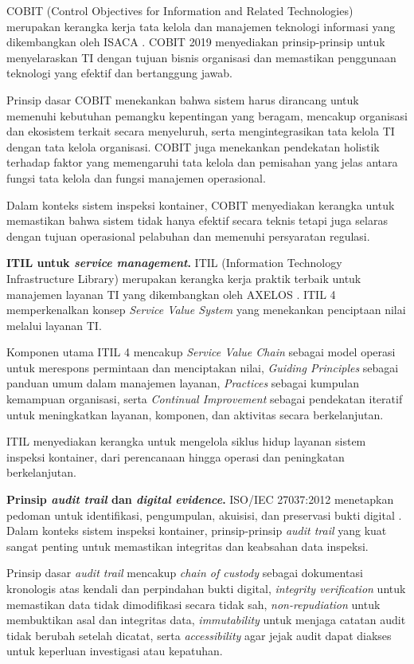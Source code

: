 COBIT (Control Objectives for Information and Related Technologies) merupakan kerangka kerja tata kelola dan manajemen teknologi informasi yang dikembangkan oleh ISACA \autocite{isaca2019}. COBIT 2019 menyediakan prinsip-prinsip untuk menyelaraskan TI dengan tujuan bisnis organisasi dan memastikan penggunaan teknologi yang efektif dan bertanggung jawab.

Prinsip dasar COBIT menekankan bahwa sistem harus dirancang untuk memenuhi
kebutuhan pemangku kepentingan yang beragam, mencakup organisasi dan ekosistem
terkait secara menyeluruh, serta mengintegrasikan tata kelola TI dengan tata
kelola organisasi. COBIT juga menekankan pendekatan holistik terhadap faktor
yang memengaruhi tata kelola dan pemisahan yang jelas antara fungsi tata kelola
dan fungsi manajemen operasional.

Dalam konteks sistem inspeksi kontainer, COBIT menyediakan kerangka untuk memastikan bahwa sistem tidak hanya efektif secara teknis tetapi juga selaras dengan tujuan operasional pelabuhan dan memenuhi persyaratan regulasi.

\textbf{ITIL untuk \textit{service management}.}
ITIL (Information Technology Infrastructure Library) merupakan kerangka kerja praktik terbaik untuk manajemen layanan TI yang dikembangkan oleh AXELOS \autocite{axelos2019}. ITIL 4 memperkenalkan konsep \textit{Service Value System} yang menekankan penciptaan nilai melalui layanan TI.

Komponen utama ITIL 4 mencakup \textit{Service Value Chain} sebagai model
operasi untuk merespons permintaan dan menciptakan nilai, \textit{Guiding
Principles} sebagai panduan umum dalam manajemen layanan, \textit{Practices}
sebagai kumpulan kemampuan organisasi, serta \textit{Continual Improvement}
sebagai pendekatan iteratif untuk meningkatkan layanan, komponen, dan aktivitas
secara berkelanjutan.

ITIL menyediakan kerangka untuk mengelola siklus hidup layanan sistem inspeksi kontainer, dari perencanaan hingga operasi dan peningkatan berkelanjutan.

\textbf{Prinsip \textit{audit trail} dan \textit{digital evidence}.}
ISO/IEC 27037:2012 menetapkan pedoman untuk identifikasi, pengumpulan, akuisisi, dan preservasi bukti digital \autocite{iso27037}. Dalam konteks sistem inspeksi kontainer, prinsip-prinsip \textit{audit trail} yang kuat sangat penting untuk memastikan integritas dan keabsahan data inspeksi.

Prinsip dasar \textit{audit trail} mencakup \textit{chain of custody} sebagai
dokumentasi kronologis atas kendali dan perpindahan bukti digital,
\textit{integrity verification} untuk memastikan data tidak dimodifikasi secara
tidak sah, \textit{non-repudiation} untuk membuktikan asal dan integritas data,
\textit{immutability} untuk menjaga catatan audit tidak berubah setelah
dicatat, serta \textit{accessibility} agar jejak audit dapat diakses untuk
keperluan investigasi atau kepatuhan.

